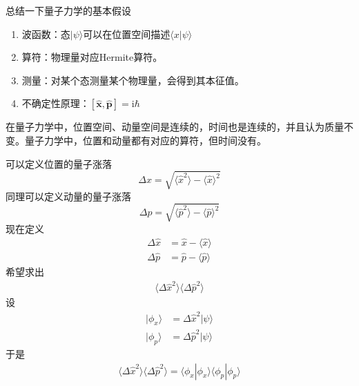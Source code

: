 \documentclass[12pt]{article}
\begin{document}
    总结一下量子力学的基本假设
    \begin{enumerate}
        \item 波函数：态$|\psi \rangle$可以在位置空间描述$\langle x|\psi\rangle$
        \item 算符：物理量对应Hermite算符。
        \item 测量：对某个态测量某个物理量，会得到其本征值。
        \item 不确定性原理：$[\hat{\bm{x}},\hat{\bm{p}}] = \mathrm{i}\hbar$
    \end{enumerate}
    在量子力学中，位置空间、动量空间是连续的，时间也是连续的，并且认为质量不变。量子力学中，位置和动量都有对应的算符，但时间没有。

    可以定义位置的量子涨落
    \begin{equation}
        \Delta x = \sqrt{\langle \hat{x}^2 \rangle - \langle \hat{x} \rangle^2}
    \end{equation}
    同理可以定义动量的量子涨落
    \begin{equation}
        \Delta p = \sqrt{\langle \hat{p}^2 \rangle - \langle \hat{p} \rangle^2}
    \end{equation}
    现在定义 
    \begin{equation}\begin{aligned}
        \Delta \hat{x} &= \hat{x} - \langle \hat{x} \rangle \\
        \Delta \hat{p} &= \hat{p} - \langle \hat{p} \rangle
    \end{aligned}\end{equation}
    希望求出
    \begin{equation}\begin{aligned}
        \langle \Delta \hat{x}^2\rangle\langle \Delta \hat{p}^2\rangle
    \end{aligned}\end{equation}
    设
    \begin{equation}\begin{aligned}
        |\phi_x \rangle &= \Delta \hat{x}^2|\psi\rangle\\
        |\phi_p \rangle &= \Delta \hat{p}^2|\psi\rangle
    \end{aligned}\end{equation}
    于是 
    \begin{equation}\begin{aligned}
        \langle \Delta \hat{x}^2\rangle\langle \Delta \hat{p}^2\rangle = \langle \phi_x | \phi_x \rangle \langle \phi_p | \phi_p \rangle
    \end{aligned}\end{equation}
\end{document}
